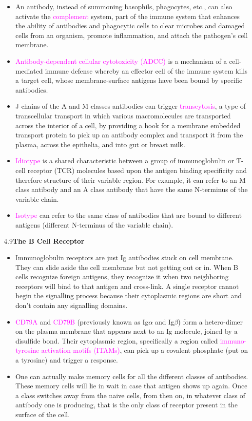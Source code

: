 \documentclass[UTF8]{book}
\newcommand{\pink}[1]{\textcolor{magenta}{#1}}
\begin{document}
\begin{itemize}
\item An antibody, instead of summoning basophils, phagocytes, etc., can also activate the \pink{complement} system, part of the immune system that enhances the ability of antibodies and phagocytic cells to clear microbes and damaged cells from an organism, promote inflammation, and attach the pathogen's cell membrane.
\item \pink{Antibody-dependent cellular cytotoxicity (ADCC)} is a mechanism of a cell-mediated immune defense whereby an effector cell of the immune system kills a target cell, whose membrane-surface antigens have been bound by specific antibodies. 
\item J chains of the A and M classes antibodies can trigger \pink{transcytosis}, a type of transcellular transport in which various macromolecules are transported across the interior of a cell, by providing a hook for a membrane embedded transport protein to pick up an antibody complex and transport it from the plasma, across the epithelia, and into gut or breast milk.
\item \pink{Idiotype} is a shared characteristic between a group of immunoglobulin or T-cell receptor (TCR) molecules based upon the antigen binding specificity and therefore structure of their variable region. For example, it can refer to an M class antibody and an A class antibody that have the same N-terminus of the variable chain.
\item \pink{Isotype} can refer to the same class of antibodies that are bound to different antigens (different N-terminus of the variable chain).
\end{itemize}
4.9\quad \textbf{The B Cell Receptor}
\begin{itemize}
\item Immunoglobulin receptors are just Ig antibodies stuck on cell membrane. They can slide aside the cell membrane but not getting out or in. When B cells recognize foreign antigens, they recognize it when two neighboring receptors will bind to that antigen and cross-link. A single receptor cannot begin the signalling process because their cytoplasmic regions are short and don't contain any signalling domains.
\item \pink{CD79A} and \pink{CD79B} (previously known as Ig$\alpha$ and Ig$\beta$) form a hetero-dimer on the plasma membrane that appears next to an Ig molecule, joined by a disulfide bond. Their cytoplasmic region, specifically a region called \pink{immuno-tyrosine activation motifs (ITAMs)}, can pick up a covalent phosphate (put on a tyrosine) and trigger a response.  
\item One can actually make memory cells for all the different classes of antibodies. These memory cells will lie in wait in case that antigen shows up again. Once a class switches away from the naive cells, from then on, in whatever class of antibody one is producing, that is the only class of receptor present in the surface of the cell.
\end{itemize}
\end{document}

